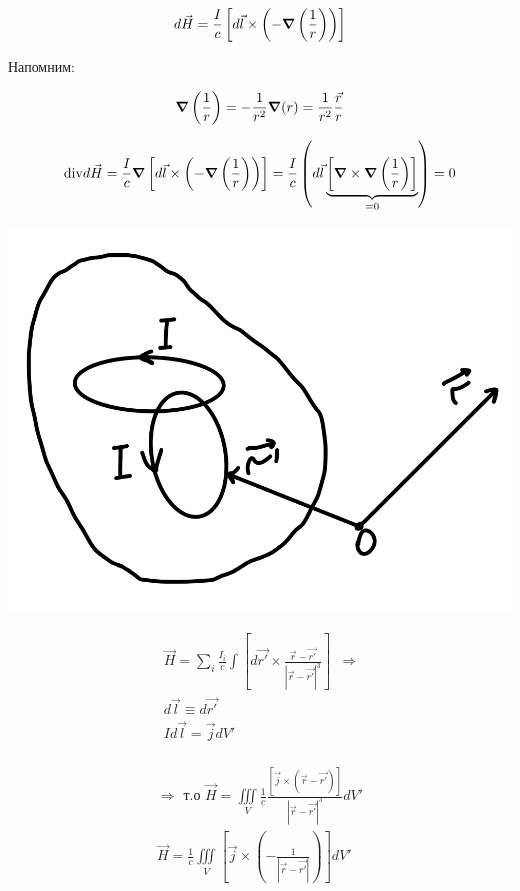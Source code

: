 \[
d\vec{H}=\frac{I}{c}\left[d\vec{l}\times \left( -\grad\left( \frac{1}{r}  \right) \right)\right] 
\]

Напомним: 

\[
\grad \left( \frac{1}{r}\right)=-\frac{1}{r^2}\grad(r)=\frac{1}{r^2}\frac{\vec{r}}{r} 
\]

\[
\mathrm{div}d\vec{H}=\frac{I}{c}\grad \left[ d\vec{l}\times \left( -\grad \left( \frac{1}{r}  \right) \right) \right]=\frac{I}{c}\left( d\vec{l} \underbrace{\left[ \grad \times \grad\left( \frac{1}{r}  \right) \right]}_{=0} \right) =0  
\]

\noindent
\begin{minipage}[c]{0.35\textwidth} %
    \includegraphics[width=\textwidth]{im/63.png}{} %
\end{minipage}%
\hfill
\begin{minipage}[c]{0.7\textwidth} %
   
    \[
    \begin{array}{l|l}
        \vec{H}=\sum_{i} \frac{I_i}{c}\int \left[ d\vec{r'}\times \frac{\vec{r}-\vec{r'}}{|\vec{r}-\vec{r'}|^3}  \right] & \Rightarrow \\
        d\vec{l}\equiv d\vec{r'} & \\
        Id\vec{l}=\vec{j}dV' & \\
    \end{array}
    \]

\end{minipage}

\[
\begin{array}{|l}
    \Rightarrow \text{ т.о }\vec{H}=\underset{V}{\iiint}\frac{1}{c} \frac{[\vec{j}\times (\vec{r}-\vec{r'})]}{|\vec{r}-\vec{r'}|^3}dV' \\ 
    \vec{H}= \frac{1}{c} \underset{V}{\iiint} \left[ \vec{j}\times \left( -\frac{1}{|\vec{r}-\vec{r'}|} \right) \right]dV'
\end{array}
\]

